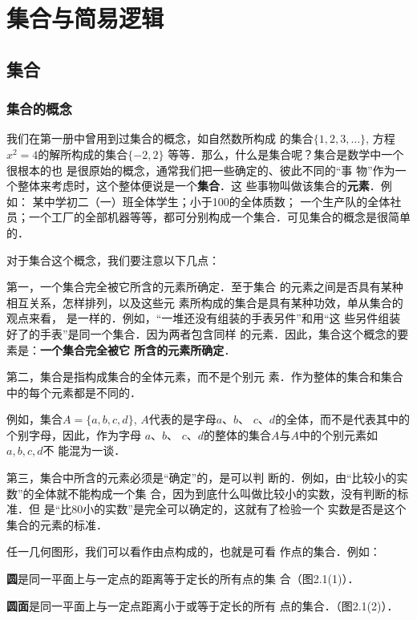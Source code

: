 \chapter{集合与简易逻辑}

\section{集合}
\subsection{集合的概念}
我们在第一册中曾用到过集合的概念，如自然数所构成
的集合$\{1,2,3,\ldots\}$, 方程$x^2=4$的解所构成的集合$\{-2,2\}$
等等．那么，什么是集合呢？集合是数学中一个很根本的也
是很原始的概念，通常我们把一些确定的、彼此不同的“事
物”作为一个整体来考虑时，这个整体便说是一个\textbf{集合}．这
些事物叫做该集合的\textbf{元素}．例如：
某中学初二（一）班全体学生；小于100的全体质数；
一个生产队的全体社员；一个工厂的全部机器等等，都可分别构成一个集合．可见集合的概念是很简单
的．

对于集合这个概念，我们要注意以下几点：

第一，一个集合完全被它所含的元素所确定．至于集合
的元素之间是否具有某种相互关系，怎样排列，以及这些元
素所构成的集合是具有某种功效，单从集合的观点来看，
是一样的．例如，“一堆还没有组装的手表另件”和用“这
些另件组装好了的手表”是同一个集合．因为两者包含同样
的元素．因此，集合这个概念的要素是：\textbf{一个集合完全被它
	所含的元素所确定}．

第二，集合是指构成集合的全体元素，而不是个别元
素．作为整体的集合和集合中的每个元素都是不同的．

例如，集合$A=\{a,b,c,d\}$, $A$代表的是字母$a$、$b$、
$c$、$d$的全体，而不是代表其中的个别字母，因此，作为字母
$a$、$b$、
$c$、$d$的整体的集合$A$与$A$中的个别元素如$a,b,c,d$不
能混为一谈．

第三，集合中所含的元素必须是“确定”的，是可以判
断的．例如，由“比较小的实数”的全体就不能构成一个集
合，因为到底什么叫做比较小的实数，没有判断的标准．但
是“比80小的实数”是完全可以确定的，这就有了检验一个
实数是否是这个集合的元素的标准．

任一几何图形，我们可以看作由点构成的，也就是可看
作点的集合．例如：

\textbf{圆}是同一平面上与一定点的距离等于定长的所有点的集
合（图2.1(1)）．

\textbf{圆面}是同一平面上与一定点距离小于或等于定长的所有
点的集合．（图2.1(2)）．

